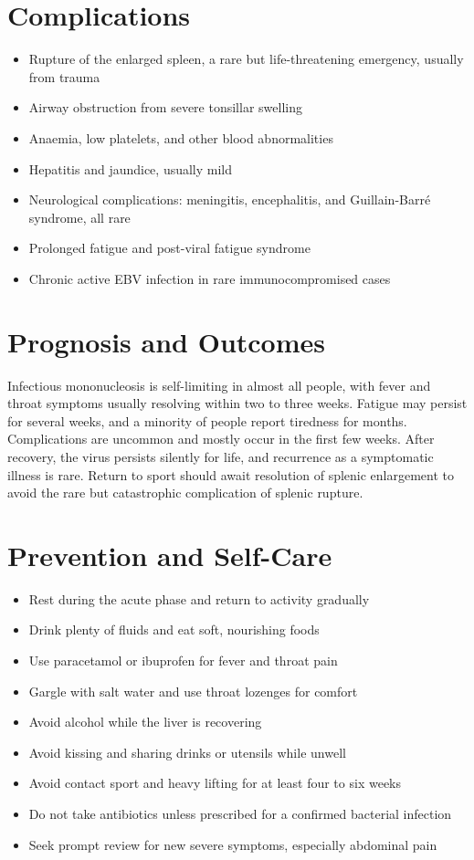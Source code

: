 \section*{Complications}
\begin{itemize}
    \item Rupture of the enlarged spleen, a rare but life-threatening emergency, usually from trauma
    \item Airway obstruction from severe tonsillar swelling
    \item Anaemia, low platelets, and other blood abnormalities
    \item Hepatitis and jaundice, usually mild
    \item Neurological complications: meningitis, encephalitis, and Guillain-Barré syndrome, all rare
    \item Prolonged fatigue and post-viral fatigue syndrome
    \item Chronic active EBV infection in rare immunocompromised cases
\end{itemize}

\section*{Prognosis and Outcomes}
Infectious mononucleosis is self-limiting in almost all people, with fever and throat symptoms usually resolving within two to three weeks. Fatigue may persist for several weeks, and a minority of people report tiredness for months. Complications are uncommon and mostly occur in the first few weeks. After recovery, the virus persists silently for life, and recurrence as a symptomatic illness is rare. Return to sport should await resolution of splenic enlargement to avoid the rare but catastrophic complication of splenic rupture.

\section*{Prevention and Self-Care}
\begin{itemize}
    \item Rest during the acute phase and return to activity gradually
    \item Drink plenty of fluids and eat soft, nourishing foods
    \item Use paracetamol or ibuprofen for fever and throat pain
    \item Gargle with salt water and use throat lozenges for comfort
    \item Avoid alcohol while the liver is recovering
    \item Avoid kissing and sharing drinks or utensils while unwell
    \item Avoid contact sport and heavy lifting for at least four to six weeks
    \item Do not take antibiotics unless prescribed for a confirmed bacterial infection
    \item Seek prompt review for new severe symptoms, especially abdominal pain
\end{itemize}

